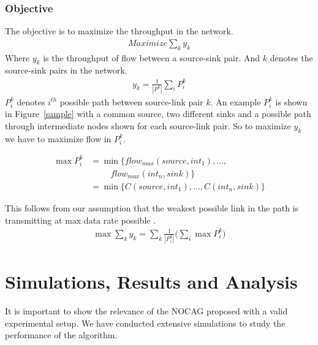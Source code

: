 \documentclass[conference]{IEEEtran}
\begin{document}
\subsubsection{Objective}
The objective is to maximize the throughput in the network.
\begin{equation}
\begin{split}
Maximize \sum_{k} y_{k} 
  \end{split}
\end{equation}
Where $y_{k}$ is the throughput of flow between a source-sink pair. And  $k$ denotes the source-sink pairs in the network.
\begin{equation}
\begin{split}
y_{k} = { \frac{1}{|P^k|} \sum_{i} P_i^k}  
\end{split}
\end{equation}
$P_i^k$ denotes $i^{th}$ possible path between source-link pair $k$.
An example $P_i^k$ is shown in Figure~\ref{sample} with a common source, two different sinks and a possible path through intermediate nodes shown for each source-link pair.
So to maximize $y_k$ we have to maximize flow in $P_i^k$.

\begin{equation}
\begin{aligned}
 \max P_i^k &= \min \{flow_{max}(source,int_1),  \dots ,\\
	     &\hspace{1cm} flow_{max}(int_n,sink)\}  \\
	    &= \min \{C(source,int_1),  \dots ,C(int_n,sink)\} 
\end{aligned}
 \end{equation}

This follows from our assumption that
the weakest possible link in the path is transmitting at max data rate possible \cite{ahlswede2000network}.
\begin{equation}
 \begin{split}
\max \sum_{k} y_k = \sum_{k} \frac{1}{|P_i^k|} \Big( \sum_{i} \max P_i^k   \Big)
 \end{split}
\end{equation}



\section{Simulations, Results and Analysis}
It is important to show the relevance of the NOCAG proposed with a valid experimental setup. 
We have conducted extensive simulations to study the performance of the algorithm.
\end{document}
